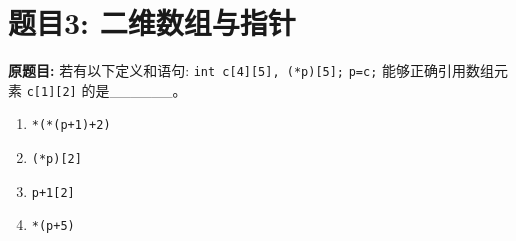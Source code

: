 \documentclass[a4paper,12pt]{article}
\begin{document}
\vspace{1cm}

\section*{题目3: 二维数组与指针}

\textbf{原题目:}
若有以下定义和语句:
\newline
\texttt{int c[4][5], (*p)[5];}
\newline
\texttt{p=c;}
\newline
能够正确引用数组元素 \texttt{c[1][2]} 的是\_\_\_\_\_\_。
\begin{enumerate}
	\item[A)] \texttt{*(*(p+1)+2)}
	\item[B)] \texttt{(*p)[2]}
	\item[C)] \texttt{p+1[2]}
	\item[D)] \texttt{*(p+5)}
\end{enumerate}
\end{document}
